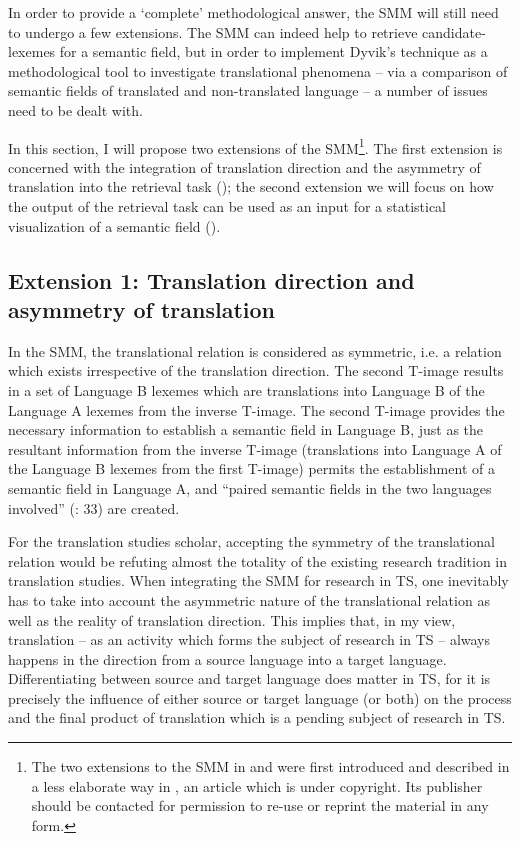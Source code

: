 In order to provide a ‘complete’ methodological answer, the SMM will still need to undergo a few extensions. The SMM can indeed help to retrieve candidate-lexemes for a semantic field, but in order to implement Dyvik’s technique as a methodological tool to investigate translational phenomena – via a comparison of semantic fields of translated and non-translated language – a number of issues need to be dealt with.



In this section, I will propose two extensions of the SMM\footnote{The two extensions to the SMM in  and  were first introduced and described in a less elaborate way in \citet{VandevoordeEtAl2017}, an article which is under copyright. Its publisher should be contacted for permission to re-use or reprint the material in any form.}. The first extension is concerned with the integration of translation direction and the asymmetry of translation into the retrieval task (); the second extension we will focus on how the output of the retrieval task can be used as an input for a statistical visualization of a semantic field ().


\subsection{\label{sec:3.5.1}  Extension 1: Translation direction and asymmetry of translation}

In the SMM, the translational relation is considered as symmetric, i.e. a relation which exists irrespective of the translation direction. The second T-image results in a set of Language B lexemes which are translations into Language B of the Language A lexemes from the inverse T-image. The second T-image provides the necessary information to establish a semantic field in Language B, just as the resultant information from the inverse T-image (translations into Language A of the Language B lexemes from the first T-image) permits the establishment of a semantic field in Language A, and “paired semantic fields in the two languages involved” (\citealt{langemets_translations_2005}: 33) are created.



For the translation studies scholar, accepting the symmetry of the translational relation would be refuting almost the totality of the existing research tradition in translation studies. When integrating the SMM for research in TS, one inevitably has to take into account the asymmetric nature of the translational relation as well as the reality of translation direction. This implies that, in my view, translation – as an activity which forms the subject of research in TS – always happens in the direction from a source language into a target language. Differentiating between source and target language does matter in TS, for it is precisely the influence of either source or target language (or both) on the process and the final product of translation which is a pending subject of research in TS.



